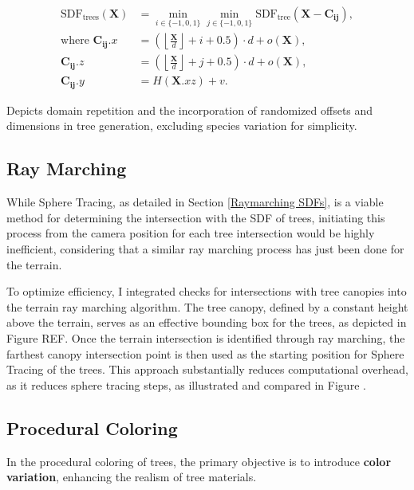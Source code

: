 \begin{equation}
\begin{aligned}
\text{SDF}_\text{trees}(\mathbf{X}) &= \min_{i\in\{-1,0,1\}}\min_{j\in\{-1,0,1\}}\text{SDF}_\text{tree}(\mathbf{X} - \mathbf{C_{ij}}), \\
\text{where } \mathbf{C_{ij}}.x & = \left(\left\lfloor \frac{\mathbf{X}}{d} \right\rfloor + i + 0.5\right) \cdot d + o(\mathbf{X}), \\
\mathbf{C_{ij}}.z & = \left(\left\lfloor \frac{\mathbf{X}}{d} \right\rfloor + j + 0.5\right) \cdot d + o(\mathbf{X}), \\
\mathbf{C_{ij}}.y &= H(\mathbf{X}.{xz}) + v.
\end{aligned}
\end{equation}

{Depicts domain repetition and the incorporation of randomized offsets and dimensions in tree generation, excluding species variation for simplicity.}

\subsection{Ray Marching}

While Sphere Tracing, as detailed in Section \ref{Raymarching SDFs}, is a viable method for determining the intersection with the SDF of trees, initiating this process from the camera position for each tree intersection would be highly inefficient, considering that a similar ray marching process has just been done for the terrain.

To optimize efficiency, I integrated checks for intersections with tree canopies into the terrain ray marching algorithm. The tree canopy, defined by a constant height above the terrain, serves as an effective bounding box for the trees, as depicted in Figure REF. Once the terrain intersection is identified through ray marching, the farthest canopy intersection point is then used as the starting position for Sphere Tracing of the trees. This approach substantially reduces computational overhead, as it reduces sphere tracing steps, as illustrated and compared in Figure . 

\subsection{Procedural Coloring}

In the procedural coloring of trees, the primary objective is to introduce \textbf{color variation}, enhancing the realism of tree materials. 

